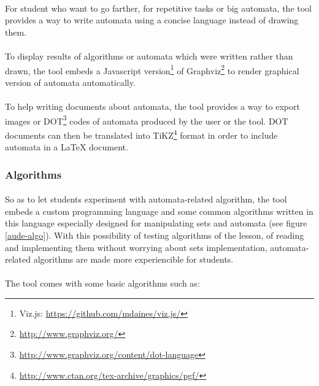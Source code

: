 \documentclass{article}
\begin{document}
\begin{sloppypar}
\paragraph{}
For student who want to go farther, for repetitive tasks or big automata, the tool provides a way to write automata using a concise language instead of drawing them.


\paragraph{}
To display results of algorithms or automata which were written rather than drawn, the tool embeds a Javascript version\footnote{Viz.js: \href{https://github.com/mdaines/viz.js/}{https://github.com/mdaines/viz.js/}} of Graphviz\footnote{\href{http://www.graphviz.org/}{http://www.graphviz.org/}} to render graphical version of automata automatically.


\paragraph{}
To help writing documents about automata, the tool provides a way to export images or DOT\footnote{\href{http://www.graphviz.org/content/dot-language}{http://www.graphviz.org/content/dot-language}} codes of automata produced by the user or the tool. DOT documents can then be translated into TiKZ\footnote{\href{http://www.ctan.org/tex-archive/graphics/pgf/}{http://www.ctan.org/tex-archive/graphics/pgf/}} format in order to include automata in a LaTeX document.




\subsubsection{ Algorithms}


\paragraph{}
So as to let students experiment with automata-related algorithm, the tool embeds a custom programming language and some common algorithms written in this language especially designed for manipulating sets and automata (see figure \ref{aude-algo}). With this possibility of testing algorithms of the lesson, of reading and implementing them without worrying about sets implementation, automata-related algorithms are made more experiencible for students.


\paragraph{}
The tool comes with some basic algorithms such as:
          

\end{sloppypar}
\end{document}
